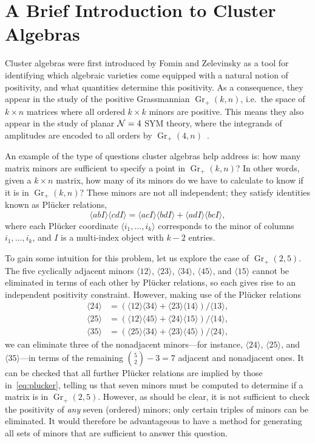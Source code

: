 \documentclass[11pt]{article}
\DeclareMathOperator{\Gr}{Gr}
\def\ket#1{\langle #1 \rangle}
\begin{document}
\section{A Brief Introduction to Cluster Algebras} \label{sec:brief_intro}

Cluster algebras were first introduced by Fomin and Zelevinsky \cite{1021.16017} as a tool for identifying which algebraic varieties come equipped with a natural notion of positivity, and what quantities determine this positivity. As a consequence, they appear in the study of the positive Grassmannian $\Gr_{+}(k,n)$, i.e.~the space of $k\times n$ matrices where all ordered $k\times k$ minors are positive. This means they also appear in the study of planar ${\cal N} = 4$ SYM theory, where the integrands of amplitudes are encoded to all orders by $\Gr_+(4,n)$~\cite{ArkaniHamed:2012nw}.

An example of the type of questions cluster algebras help address is: how many matrix minors are sufficient to specify a point in $\Gr_+(k,n)$? In other words, given a $k \times n$ matrix, how many of its minors do we have to calculate to know if it is in $\Gr_+(k,n)$? These minors are not all independent; they satisfy identities known as Pl\"ucker relations,
\begin{equation}
  \label{eq:plucker-rel}
  \ket{abI} \ket{cdI} = \ket{acI} \ket{bdI} + \ket{adI}\ket{bcI},
\end{equation}
where each Pl\"ucker coordinate $\ket{i_1,\ldots,i_k}$ corresponds to the minor of columns $i_1, \ldots,i_k$, and $I$ is a multi-index object with $k-2$ entries.

To gain some intuition for this problem, let us explore the case of $\Gr_+(2,5)$. The five cyclically adjacent minors $\ket{12}$, $\ket{23}$, $\ket{34}$, $\ket{45}$, and $\ket{15}$ cannot be eliminated in terms of each other by Pl\"ucker relations, so each gives rise to an independent positivity constraint. However, making use of the Pl\"ucker relations 
\begin{equation} \label{eq:plucker}
\begin{split}
	\ket{24} &= (\ket{12}\ket{34} + \ket{23}\ket{14})/\ket{13},\\
	\ket{25} &= (\ket{12}\ket{45} + \ket{24}\ket{15})/\ket{14},\\
	\ket{35} &= (\ket{25}\ket{34} + \ket{23}\ket{45})/\ket{24},
\end{split}	 	
\end{equation} 
we can eliminate three of the nonadjacent minors---for instance, $\ket{24}$, $\ket{25}$, and $\ket{35}$---in terms of the remaining ${{5}\choose{2}} - 3 = 7$ adjacent and nonadjacent ones. It can be checked that all further Pl\"ucker relations are implied by those in~\eqref{eq:plucker}, telling us that seven minors must be computed to determine if a matrix is in $\Gr_+(2,5)$. However, as should be clear, it is not sufficient to check the positivity of {\it any} seven (ordered) minors; only certain triples of minors can be eliminated. It would therefore be advantageous to have a method for generating all sets of minors that are sufficient to answer this question.
\end{document}
